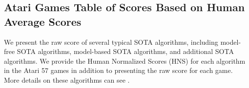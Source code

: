 \def\mueslinumframes{2.00E+08}
\def\muesligametime{38.5}


\def\goexploremeanhns{4989.31}
\def\goexploremeanhnsle{4.99E-09}

\def\goexploremedianhns{1451.55}
\def\goexploremedianhnsle{1.45E-09}

\def\goexploreHWRB{15}
\def\goexploreHWRBle{1.50E-09}


\def\goexploremeanHWRNS{116.89}
\def\goexploremeanHWRNSle{1.17E-10}


\def\goexploremedianHWRNS{50.50}
\def\goexploremedianHWRNSle{5.05E-11}


\def\goexploremeanSABER{71.80}
\def\goexploremeanSABERle{7.18E-11}


\def\goexploremedianSABER{50.50}
\def\goexploremedianSABERle{5.05E-11}

\def\goexplorenumframes{1.00E+10}
\def\goexploregametime{1929}


\def\LBCHmeanhns{10077.52}
\def\LBCHmeanhnsle{4.81E-07 }

\def\LBCHmedianhns{1665.60}
\def\LBCHmedianhnsle{5.73E-08 }

\def\LBCHHWRB{24 }
\def\LBCHHWRBle{1.10E-07 }


\def\LBCHmeanHWRNS{154.27}
\def\LBCHmeanHWRNSle{7.71E-09 }


\def\LBCHmedianHWRNS{50.63}
\def\LBCHmedianHWRNSle{2.53E-09 }


\def\LBCHmeanSABER{71.26}
\def\LBCHmeanSABERle{3.56E-09 }


\def\LBCHmedianSABER{50.63}
\def\LBCHmedianSABERle{2.53E-09 }

\def\LBCHnumframes{1.00E+09 }
\def\LBCHgametime{192.5 }


\def\mememeanhns{4081.14}

\def\mememedianhns{1225.19}

\def\memeHWRB{24 }
\def\memeHWRBle{1.10E-07 }


\def\mememeanHWRNS{154.27}
\def\mememeanHWRNSle{7.71E-09 }


\def\mememedianHWRNS{50.63}
\def\mememedianHWRNSle{2.53E-09 }


\def\mememeanSABER{71.26}
\def\mememeanSABERle{3.56E-09 }


\def\mememedianSABER{50.63}
\def\mememedianSABERle{2.53E-09 }

\def\memenumframes{1.00E+09 }
\def\memegametime{192.5 }


\subsection{Atari Games Table of Scores Based on Human Average Scores}
\label{app: Atari Games Table of Scores Based on Human Average Records}
We present the raw score of several typical SOTA algorithms, including model-free SOTA algorithms, model-based SOTA algorithms, and additional SOTA algorithms. We provide the Human Normalized Scores (HNS) for each algorithm in the Atari 57 games in addition to presenting the raw score for each game. More details on these algorithms can see \cite{ale2,atarihuman,atari_review}.

